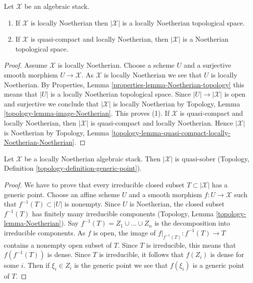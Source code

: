 \begin{lemma}
\label{lemma-Noetherian-topology}
Let $\mathcal{X}$ be an algebraic stack.
\begin{enumerate}
\item If $\mathcal{X}$ is locally Noetherian then $|\mathcal{X}|$
is a locally Noetherian topological space.
\item If $\mathcal{X}$ is quasi-compact and locally Noetherian, then
$|\mathcal{X}|$ is a Noetherian topological space.
\end{enumerate}
\end{lemma}

\begin{proof}
Assume $\mathcal{X}$ is locally Noetherian.
Choose a scheme $U$ and a surjective smooth morphism
$U \to \mathcal{X}$. As $\mathcal{X}$ is locally Noetherian
we see that $U$ is locally Noetherian. By
Properties, Lemma \ref{properties-lemma-Noetherian-topology}
this means that $|U|$ is a locally Noetherian topological space.
Since $|U| \to |\mathcal{X}|$ is open and surjective we conclude that
$|\mathcal{X}|$ is locally Noetherian by
Topology, Lemma \ref{topology-lemma-image-Noetherian}.
This proves (1). If $\mathcal{X}$ is quasi-compact and locally Noetherian,
then $|\mathcal{X}|$ is quasi-compact and locally Noetherian. Hence
$|\mathcal{X}|$ is Noetherian by Topology, Lemma
\ref{topology-lemma-quasi-compact-locally-Noetherian-Noetherian}.
\end{proof}

\begin{lemma}
\label{lemma-locally-Noetherian-quasi-sober}
Let $\mathcal{X}$ be a locally Noetherian algebraic stack.
Then $|\mathcal{X}|$ is quasi-sober (Topology, Definition
\ref{topology-definition-generic-point}).
\end{lemma}

\begin{proof}
We have to prove that every
irreducible closed subset $T \subset |\mathcal{X}|$ has a generic point.
Choose an affine scheme $U$ and a smooth morphism $f : U \to \mathcal{X}$
such that $f^{-1}(T) \subset |U|$ is nonempty. Since $U$ is Noetherian,
the closed subset $f^{-1}(T)$ has finitely many irreducible components
(Topology, Lemma \ref{topology-lemma-Noetherian}).
Say $f^{-1}(T) = Z_1 \cup \ldots \cup Z_n$ is the decomposition into
irreducible components. As $f$ is open, the image of
$f|_{f^{-1}(T)} : f^{-1}(T) \to T$ contains a nonempty open subset of $T$.
Since $T$ is irreducible, this means that $f(f^{-1}(T))$ is dense.
Since $T$ is irreducible, it follows that $f(Z_i)$ is dense for some $i$.
Then if $\xi_i \in Z_i$ is the generic point we see that
$f(\xi_i)$ is a generic point of $T$.
\end{proof}





